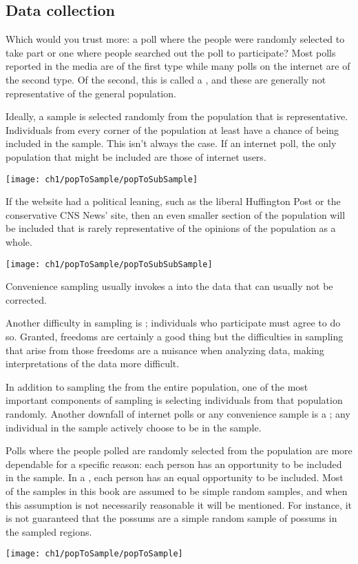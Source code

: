 \subsection{Data collection}

Which would you trust more: a poll where the people were randomly selected to take part or one where people searched out the poll to participate? Most polls reported in the media are of the first type while many polls on the internet are of the second type. Of the second, this is called a , and these are generally not representative of the general population.

Ideally, a sample is selected randomly from the population that is representative. Individuals from every corner of the population at least have a chance of being included in the sample. This isn't always the case. If an internet poll, the only population that might be included are those of internet users.
\begin{center}
   \texttt{[image: ch1/popToSample/popToSubSample]}
\end{center}
If the website had a political leaning, such as the liberal Huffington Post or the conservative CNS News' site, then an even smaller section of the population will be included that is rarely representative of the opinions of the population as a whole.
\begin{center}
   \texttt{[image: ch1/popToSample/popToSubSubSample]}
\end{center}
Convenience sampling usually invokes a  into the data that can usually not be corrected.

Another difficulty in sampling is ; individuals who participate must agree to do so. Granted, freedoms are certainly a good thing but the difficulties in sampling that arise from those freedoms are a nuisance when analyzing data, making interpretations of the data more difficult.

In addition to sampling the from the entire population, one of the most important components of sampling is selecting individuals from that population randomly. Another downfall of internet polls or any convenience sample is a ; any individual in the sample actively choose to be in the sample.

Polls where the people polled are randomly selected from the population are more dependable for a specific reason: each person has an opportunity to be included in the sample. In a , each person has an equal opportunity to be included. Most of the samples in this book are assumed to be simple random samples, and when this assumption is not necessarily reasonable it will be mentioned. For instance, it is not guaranteed that the possums are a simple random sample of possums in the sampled regions.
\begin{center}
   \texttt{[image: ch1/popToSample/popToSample]}
\end{center}

